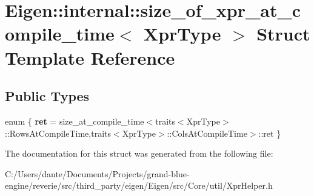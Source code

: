 \hypertarget{struct_eigen_1_1internal_1_1size__of__xpr__at__compile__time}{}\section{Eigen\+::internal\+::size\+\_\+of\+\_\+xpr\+\_\+at\+\_\+compile\+\_\+time$<$ Xpr\+Type $>$ Struct Template Reference}
\label{struct_eigen_1_1internal_1_1size__of__xpr__at__compile__time}
\subsection*{Public Types}
\begin{DoxyCompactItemize}
\item 
\mbox{\label{struct_eigen_1_1internal_1_1size__of__xpr__at__compile__time_a370e0c1046802b7794057d4602d4f5a8}} 
enum \{ {\bfseries ret} = size\+\_\+at\+\_\+compile\+\_\+time$<$traits$<$Xpr\+Type$>$\+::Rows\+At\+Compile\+Time,traits$<$Xpr\+Type$>$\+::Cols\+At\+Compile\+Time$>$\+::ret
 \}
\end{DoxyCompactItemize}


The documentation for this struct was generated from the following file\+:\begin{DoxyCompactItemize}
\item 
C\+:/\+Users/dante/\+Documents/\+Projects/grand-\/blue-\/engine/reverie/src/third\+\_\+party/eigen/\+Eigen/src/\+Core/util/Xpr\+Helper.\+h\end{DoxyCompactItemize}
